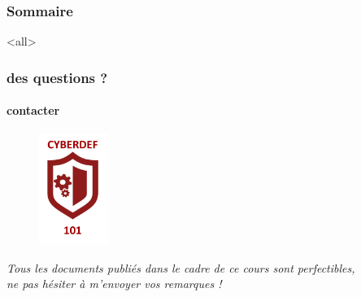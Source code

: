 \begin{frame}
 \frametitle{Sommaire}
      \begin{multicols}{2}
         \tableofcontents[hideallsubsections]
     \end{multicols}
 \end{frame}

\mode<all>{\ubody}

\begin{frame}
 \frametitle{des questions ?}
  \framesubtitle{contacter \umaila}
  					\begin{figure}
  					 \centering
   						 \includegraphics[width=0.2\textwidth]{../Tex/template.inc/Commons/CommonsPictures/cyberdef101.pdf}\\
				  \end{figure}
				 	 \centering \textit{Tous les documents publiés dans le cadre de ce cours sont perfectibles, \\ne pas hésiter à m'envoyer vos remarques !}
 \end{frame}



